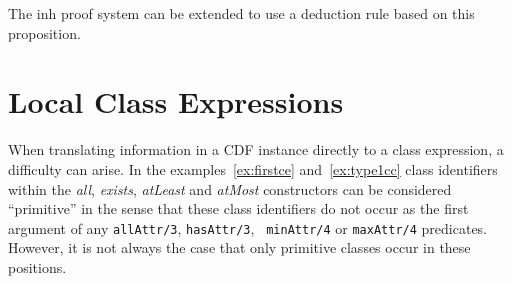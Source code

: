 The {\sc inh} proof system can be extended to use a deduction rule
based on this proposition.


\section{Local Class Expressions}

When translating information in a CDF instance directly to a class
expression, a difficulty can arise.  In the examples~\ref{ex:firstce}
and~\ref{ex:type1cc} class identifiers within the {\em all}, {\em
exists}, {\em atLeast} and {\em atMost} constructors can be considered
``primitive'' in the sense that these class identifiers do not occur
as the first argument of any {\tt allAttr/3}, {\tt hasAttr/3}, {\tt
minAttr/4} or {\tt maxAttr/4} predicates.  However, it is not always
the case that only primitive classes occur in these positions.

